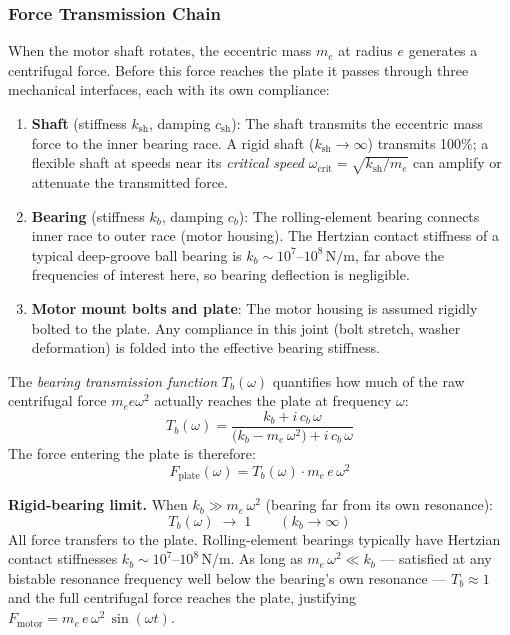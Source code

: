 \documentclass[11pt,letterpaper]{article}
\begin{document}
\subsubsection{Force Transmission Chain}
\label{sssec:transmission}

When the motor shaft rotates, the eccentric mass $m_e$ at radius $e$ generates
a centrifugal force.  Before this force reaches the plate it passes through
three mechanical interfaces, each with its own compliance:

\begin{enumerate}
  \item \textbf{Shaft} (stiffness $k_{\mathrm{sh}}$, damping $c_{\mathrm{sh}}$):
    The shaft transmits the eccentric mass force to the inner bearing race.
    A rigid shaft ($k_{\mathrm{sh}} \to \infty$) transmits 100\%; a flexible
    shaft at speeds near its \emph{critical speed}
    $\omega_{\mathrm{crit}} = \sqrt{k_{\mathrm{sh}}/m_e}$
    can amplify or attenuate the transmitted force.

  \item \textbf{Bearing} (stiffness $k_b$, damping $c_b$): The rolling-element
    bearing connects inner race to outer race (motor housing).  The Hertzian
    contact stiffness of a typical deep-groove ball bearing is
    $k_b \sim 10^7$--$10^8\,\text{N/m}$, far above the frequencies of interest
    here, so bearing deflection is negligible.

  \item \textbf{Motor mount bolts and plate}: The motor housing is assumed
    rigidly bolted to the plate.  Any compliance in this joint
    (bolt stretch, washer deformation) is folded into the effective bearing
    stiffness.
\end{enumerate}

The \emph{bearing transmission function} $T_b(\omega)$ quantifies how much of
the raw centrifugal force $m_e e \omega^2$ actually reaches the plate at
frequency $\omega$:
\begin{equation}
  T_b(\omega)
  = \frac{k_b + i\,c_b\,\omega}{\bigl(k_b - m_e\,\omega^2\bigr)
    + i\,c_b\,\omega}
  \label{eq:Tb}
\end{equation}
The force entering the plate is therefore:
\begin{equation}
  F_{\mathrm{plate}}(\omega)
  = T_b(\omega)\cdot m_e\,e\,\omega^2
  \label{eq:Fplate_transmitted}
\end{equation}

\noindent\textbf{Rigid-bearing limit.}
When $k_b \gg m_e\,\omega^2$ (bearing far from its own resonance):
\begin{equation}
  T_b(\omega) \;\to\; 1 \qquad (k_b \to \infty)
  \label{eq:Tb_rigid}
\end{equation}
All force transfers to the plate.  Rolling-element bearings typically have
Hertzian contact stiffnesses $k_b \sim 10^7$--$10^8$\,N/m.  As long as
$m_e\,\omega^2 \ll k_b$ --- satisfied at any bistable resonance frequency well
below the bearing's own resonance --- $T_b \approx 1$ and the full centrifugal
force reaches the plate, justifying
$F_{\mathrm{motor}} = m_e\,e\,\omega^2\,\sin(\omega t)$.
\end{document}
